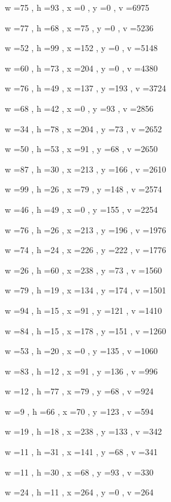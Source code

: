 \documentclass[11pt]{article}
\begin{document}
w =75 , h =93 , x =0 , y =0 , v =6975
\par
w =77 , h =68 , x =75 , y =0 , v =5236
\par
w =52 , h =99 , x =152 , y =0 , v =5148
\par
w =60 , h =73 , x =204 , y =0 , v =4380
\par
w =76 , h =49 , x =137 , y =193 , v =3724
\par
w =68 , h =42 , x =0 , y =93 , v =2856
\par
w =34 , h =78 , x =204 , y =73 , v =2652
\par
w =50 , h =53 , x =91 , y =68 , v =2650
\par
w =87 , h =30 , x =213 , y =166 , v =2610
\par
w =99 , h =26 , x =79 , y =148 , v =2574
\par
w =46 , h =49 , x =0 , y =155 , v =2254
\par
w =76 , h =26 , x =213 , y =196 , v =1976
\par
w =74 , h =24 , x =226 , y =222 , v =1776
\par
w =26 , h =60 , x =238 , y =73 , v =1560
\par
w =79 , h =19 , x =134 , y =174 , v =1501
\par
w =94 , h =15 , x =91 , y =121 , v =1410
\par
w =84 , h =15 , x =178 , y =151 , v =1260
\par
w =53 , h =20 , x =0 , y =135 , v =1060
\par
w =83 , h =12 , x =91 , y =136 , v =996
\par
w =12 , h =77 , x =79 , y =68 , v =924
\par
w =9 , h =66 , x =70 , y =123 , v =594
\par
w =19 , h =18 , x =238 , y =133 , v =342
\par
w =11 , h =31 , x =141 , y =68 , v =341
\par
w =11 , h =30 , x =68 , y =93 , v =330
\par
w =24 , h =11 , x =264 , y =0 , v =264
\par
\newpage
\end{document}
